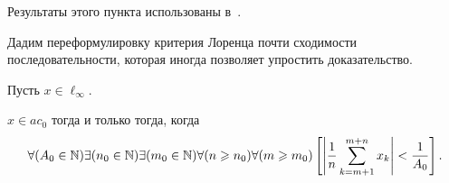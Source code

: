 Результаты этого пункта использованы в~\cite{our-mz2019ac0}.

Дадим переформулировку критерия Лоренца
\cite{lorentz1948contribution,bennett1974consistency}
почти сходимости последовательности,
которая иногда позволяет упростить доказательство.


\begin{theorem}
	\label{thm:Lorentz_mod}
	Пусть $x\in\ell_\infty$.

	$x\in ac_0$ тогда и только тогда, когда
	\begin{equation}\label{crit_pos_ac0}
		\forall(A_0\in\N)
		\exists(n_0\in\N)
		\exists(m_0\in\N)
		\forall(n\geq n_0)
		\forall(m\geq m_0)
		\\
		\left[
			\left|
			\frac{1}{n}
			\sum_{k=m+1}^{m+n} x_k
			\right|
			<
			\frac{1}{A_0}
		\right]
		.
	\end{equation}

\end{theorem}

